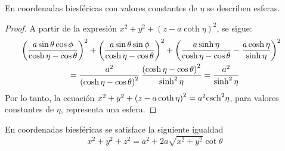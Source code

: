 \begin{prop}
En coordenadas biesféricas con valores constantes de $\eta $ se describen esferas.
\end{prop}

\begin{proof}
A partir de la expresión $x^2+y^2+\left( z-a\coth \eta \right) ^2$, se sigue:
\begin{multline*}
\hskip-0.3cm \left( \frac{a\sin \theta\cos \phi }{\cosh \eta -\cos \theta }\right)^2+\left(\frac{a\sin \theta
\sin \phi }{\cosh \eta -\cos \theta }\right) ^2+\left( \frac{a\sinh \eta}{\cosh \eta -\cos \theta }-\frac{a\cosh \eta }{\sinh \eta }\right) ^2 \\
= \frac{a^2}{\left( \cosh \eta -\cos \theta \right) ^2} \,\frac{\left(
\cosh \eta -\cos \theta \right) ^2}{\sinh ^2\eta } = \frac{a^2}{\sinh ^2\eta }
\end{multline*}
Por lo tanto, la ecuación $x^2+y^2+\left( z-a\coth \eta \right)^2= a^2 {\rm csch} ^2\eta$,
para valores constantes de $\eta $, representa una esfera.
\end{proof}

\begin{prop}
En coordenadas biesféricas se satisface la siguiente igualdad
\begin{equation}\label{biesfericas3}
x^2+y^2+z^2= a^2 +2a\sqrt{x^2+y^2}\cot\theta
\end{equation}
\end{prop}

